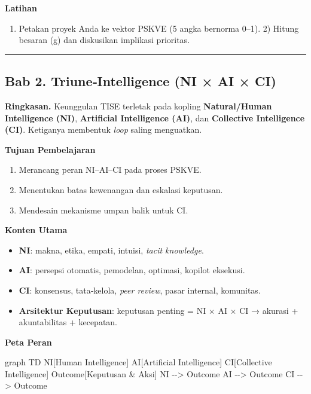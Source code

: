 \documentclass[
  letterpaper,
  DIV=11,
  numbers=noendperiod]{scrartcl}
\newenvironment{Shaded}{\begin{snugshade}}{\end{snugshade}}
\newcommand{\NormalTok}[1]{\textcolor[rgb]{0.00,0.23,0.31}{#1}}
\providecommand{\tightlist}{%
  \setlength{\itemsep}{0pt}\setlength{\parskip}{0pt}}
\begin{document}
\textbf{Latihan}

\begin{enumerate}
\def\labelenumi{\arabic{enumi}.}
\tightlist
\item
  Petakan proyek Anda ke vektor PSKVE (5 angka bernorma 0--1). 2) Hitung
  besaran (\textbar g\textbar) dan diskusikan implikasi prioritas.
\end{enumerate}

\begin{center}\rule{0.5\linewidth}{0.5pt}\end{center}

\subsection{Bab 2. Triune‑Intelligence (NI × AI ×
CI)}\label{bab-2.-triuneintelligence-ni-ai-ci}

\textbf{Ringkasan.} Keunggulan TISE terletak pada kopling
\textbf{Natural/Human Intelligence (NI)}, \textbf{Artificial
Intelligence (AI)}, dan \textbf{Collective Intelligence (CI)}. Ketiganya
membentuk \emph{loop} saling menguatkan.

\textbf{Tujuan Pembelajaran}

\begin{enumerate}
\def\labelenumi{\arabic{enumi}.}
\tightlist
\item
  Merancang peran NI--AI--CI pada proses PSKVE.
\item
  Menentukan batas kewenangan dan eskalasi keputusan.
\item
  Mendesain mekanisme umpan balik untuk CI.
\end{enumerate}

\textbf{Konten Utama}

\begin{itemize}
\tightlist
\item
  \textbf{NI}: makna, etika, empati, intuisi, \emph{tacit knowledge}.
\item
  \textbf{AI}: persepsi otomatis, pemodelan, optimasi, kopilot eksekusi.
\item
  \textbf{CI}: konsensus, tata‑kelola, \emph{peer review}, pasar
  internal, komunitas.
\item
  \textbf{Arsitektur Keputusan}: keputusan penting = NI × AI × CI →
  akurasi + akuntabilitas + kecepatan.
\end{itemize}

\textbf{Peta Peran}

\begin{Shaded}
\begin{Highlighting}[]
\NormalTok{graph TD}
\NormalTok{  NI[Human Intelligence]}
\NormalTok{  AI[Artificial Intelligence]}
\NormalTok{  CI[Collective Intelligence]}
\NormalTok{  Outcome[Keputusan \& Aksi]}
\NormalTok{  NI {-}{-}\textgreater{} Outcome}
\NormalTok{  AI {-}{-}\textgreater{} Outcome}
\NormalTok{  CI {-}{-}\textgreater{} Outcome}
\end{Highlighting}
\end{Shaded}
\end{document}
